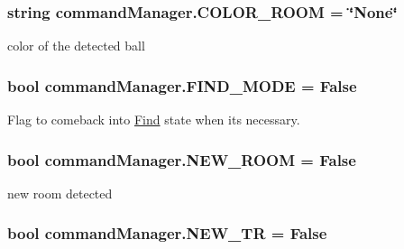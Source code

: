 \subsubsection[{\texorpdfstring{C\+O\+L\+O\+R\+\_\+\+R\+O\+OM}{COLOR_ROOM}}]{\setlength{\rightskip}{0pt plus 5cm}string command\+Manager.\+C\+O\+L\+O\+R\+\_\+\+R\+O\+OM = \char`\"{}None\char`\"{}}\hypertarget{namespacecommandManager_ae945cfc4fe1632a6952debd7a67d9f3c}{}\label{namespacecommandManager_ae945cfc4fe1632a6952debd7a67d9f3c}


color of the detected ball 

\subsubsection[{\texorpdfstring{F\+I\+N\+D\+\_\+\+M\+O\+DE}{FIND_MODE}}]{\setlength{\rightskip}{0pt plus 5cm}bool command\+Manager.\+F\+I\+N\+D\+\_\+\+M\+O\+DE = False}\hypertarget{namespacecommandManager_ad0728881cc70cfd3f8f5251b7b9af646}{}\label{namespacecommandManager_ad0728881cc70cfd3f8f5251b7b9af646}


Flag to comeback into \hyperlink{classcommandManager_1_1Find}{Find} state when it\textquotesingle{}s necessary. 

\subsubsection[{\texorpdfstring{N\+E\+W\+\_\+\+R\+O\+OM}{NEW_ROOM}}]{\setlength{\rightskip}{0pt plus 5cm}bool command\+Manager.\+N\+E\+W\+\_\+\+R\+O\+OM = False}\hypertarget{namespacecommandManager_a52e7163bf2cde17330107e6a2cf2f851}{}\label{namespacecommandManager_a52e7163bf2cde17330107e6a2cf2f851}


new room detected 

\subsubsection[{\texorpdfstring{N\+E\+W\+\_\+\+TR}{NEW_TR}}]{\setlength{\rightskip}{0pt plus 5cm}bool command\+Manager.\+N\+E\+W\+\_\+\+TR = False}\hypertarget{namespacecommandManager_a6356544112d78464670ffb9af59bed1d}{}\label{namespacecommandManager_a6356544112d78464670ffb9af59bed1d}


